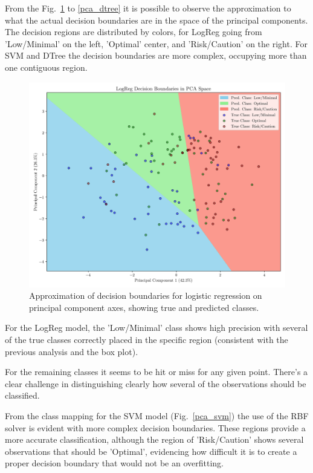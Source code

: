 \documentclass[conference]{IEEEtran}
\begin{document}
From the Fig.~\ref{pca_reglog} to \ref{pca_dtree} it is possible to observe the approximation to what the actual decision boundaries are in the space of the principal components. The decision regions are distributed by colors, for LogReg going from 'Low/Minimal' on the left, 'Optimal' center, and 'Risk/Caution' on the right. For SVM and DTree the decision boundaries are more complex, occupying more than one contiguous region.

\begin{figure}[H]
    \centering
    \includegraphics[width=1\linewidth]{assets/pca_reglog.png}
    \caption{Approximation of decision boundaries for logistic regression on principal component axes, showing true and predicted classes.}
    \label{pca_reglog}
\end{figure} %

For the LogReg model, the 'Low/Minimal' class shows high precision with several of the true classes correctly placed in the specific region (consistent with the previous analysis and the box plot).

For the remaining classes it seems to be hit or miss for any given point. There's a clear challenge in distinguishing clearly how several of the observations should be classified. 

From the class mapping for the SVM model (Fig.~\ref{pca_svm}) the use of the RBF solver is evident with more complex decision boundaries. These regions provide a more accurate classification, although the region of 'Risk/Caution' shows several observations that should be 'Optimal', evidencing how difficult it is to create a proper decision boundary that would not be an overfitting.
\end{document}
